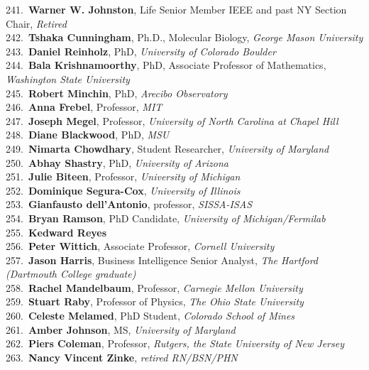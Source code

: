 241.~{\bf Warner W. Johnston}, Life Senior Member IEEE and past NY Section Chair, {\sl Retired} \\
242.~{\bf Tshaka Cunningham}, Ph.D., Molecular Biology, {\sl George Mason University} \\
243.~{\bf Daniel Reinholz}, PhD, {\sl University of Colorado Boulder} \\
244.~{\bf Bala Krishnamoorthy}, PhD, Associate Professor of Mathematics, {\sl Washington State University} \\
245.~{\bf Robert Minchin}, PhD, {\sl Arecibo Observatory} \\
246.~{\bf Anna Frebel}, Professor, {\sl MIT} \\
247.~{\bf Joseph Megel}, Professor, {\sl University of North Carolina at Chapel Hill} \\
248.~{\bf Diane Blackwood}, PhD, {\sl MSU} \\
249.~{\bf Nimarta Chowdhary}, Student Researcher, {\sl University of Maryland} \\
250.~{\bf Abhay Shastry}, PhD, {\sl University of Arizona} \\
251.~{\bf Julie Biteen}, Professor, {\sl University of Michigan} \\
252.~{\bf Dominique Segura-Cox}, {\sl University of Illinois} \\
253.~{\bf Gianfausto dell'Antonio}, professor, {\sl SISSA-ISAS} \\
254.~{\bf Bryan Ramson}, PhD Candidate, {\sl University of Michigan/Fermilab} \\
255.~{\bf Kedward Reyes} \\
256.~{\bf Peter Wittich}, Associate Professor, {\sl Cornell University} \\
257.~{\bf Jason Harris}, Business Intelligence Senior Analyst, {\sl The Hartford (Dartmouth College graduate) } \\
258.~{\bf Rachel Mandelbaum}, Professor, {\sl Carnegie Mellon University} \\
259.~{\bf Stuart Raby}, Professor of Physics, {\sl The Ohio State University } \\
260.~{\bf Celeste Melamed}, PhD Student, {\sl Colorado School of Mines} \\
261.~{\bf Amber Johnson}, MS, {\sl University of Maryland} \\
262.~{\bf Piers Coleman}, Professor, {\sl Rutgers, the State University of New Jersey} \\
263.~{\bf Nancy Vincent Zinke}, {\sl retired RN/BSN/PHN} \\
